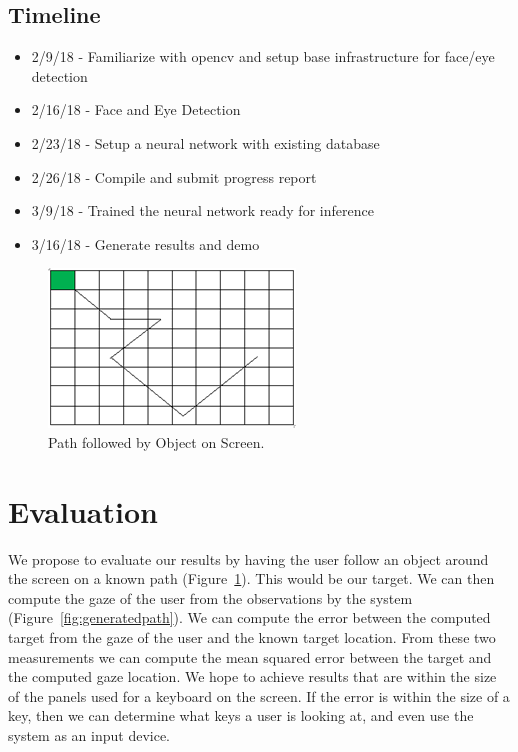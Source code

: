 \documentclass[10pt,twocolumn,letterpaper]{article}
\begin{document}
\subsection{Timeline}
\begin{itemize}
  \item 2/9/18 - Familiarize with opencv and setup base infrastructure for face/eye detection
  \item 2/16/18 - Face and Eye Detection
  \item 2/23/18 - Setup a neural network with existing database
  \item 2/26/18 - Compile and submit progress report
  \item 3/9/18 - Trained the neural network ready for inference 
  \item 3/16/18 - Generate results and demo
\end{itemize}

\begin{figure}
  \begin{center}
    \includegraphics[width=\linewidth]{original_object_path}
  \end{center}
  \caption{Path followed by Object on Screen.}
  \label{fig:originalpath}
\end{figure}

\section{Evaluation}
We propose to evaluate our results by having the user follow an object
around the screen on a known path (Figure~\ref{fig:originalpath}). 
This would be our target. We can then compute the gaze of the user from 
the observations by the system (Figure~\ref{fig:generatedpath}). 
We can compute the error between the computed target from the
gaze of the user and the known target location. From these two
measurements we can compute the mean squared error between the target
and the computed gaze location. We hope to achieve results that are
within the size of the panels used for a keyboard on the screen. If
the error is within the size of a key, then we can determine what keys
a user is looking at, and even use the system as an input device.
\end{document}
